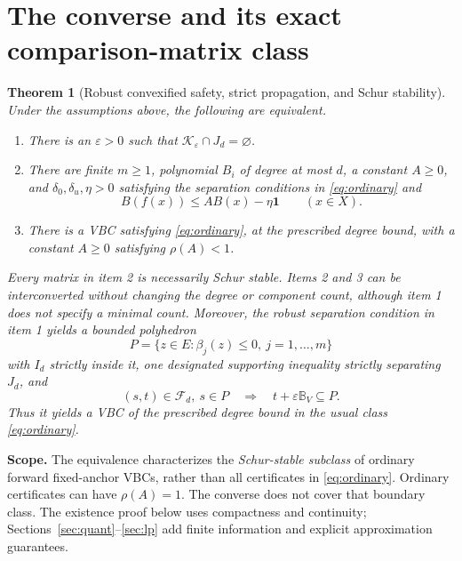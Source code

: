 \documentclass[10pt,letterpaper]{article}
\newtheorem{theorem}{Theorem}
\theoremstyle{remark}
\newcommand{\one}{\mathbf 1}
\newcommand{\ball}{\mathbb B_V}
\newcommand{\F}{\mathcal F_d}
\begin{document}
\section{The converse and its exact comparison-matrix class}
\begin{theorem}[Robust convexified safety, strict propagation, and Schur stability]\label{th:main}
Under the assumptions above, the following are equivalent.
\begin{enumerate}
\item There is an $\varepsilon>0$ such that $\mathcal K_\varepsilon\cap J_d=\varnothing$.
\item There are finite $m\geq1$, polynomial $B_i$ of degree at most $d$, a constant $A\geq0$, and $\delta_0,\delta_u,\eta>0$ satisfying the separation conditions in \eqref{eq:ordinary} and
\begin{equation}\label{eq:strict}
 B(f(x))\leq AB(x)-\eta\one\qquad(x\in X).
\end{equation}
\item There is a VBC satisfying \eqref{eq:ordinary}, at the prescribed degree bound, with a constant $A\geq0$ satisfying $\rho(A)<1$.
\end{enumerate}
Every matrix in item 2 is necessarily Schur stable. Items 2 and 3 can be interconverted without changing the degree or component count, although item 1 does not specify a minimal count.
Moreover, the robust separation condition in item 1 yields a bounded polyhedron
\[
 P=\{z\in E:\beta_j(z)\leq0,\ j=1,\ldots,m\}
\]
with $I_d$ strictly inside it, one designated supporting inequality strictly separating $J_d$, and
\[
 (s,t)\in\F,\ s\in P\quad\Longrightarrow\quad t+\varepsilon\ball\subseteq P.
\]
Thus it yields a VBC of the prescribed degree bound in the usual class \eqref{eq:ordinary}.
\end{theorem}

\textbf{Scope.} The equivalence characterizes the \emph{Schur-stable subclass} of ordinary forward fixed-anchor VBCs, rather than all certificates in \eqref{eq:ordinary}. Ordinary certificates can have $\rho(A)=1$. The converse does not cover that boundary class. The existence proof below uses compactness and continuity; Sections~\ref{sec:quant}--\ref{sec:lp} add finite information and explicit approximation guarantees.
\end{document}
